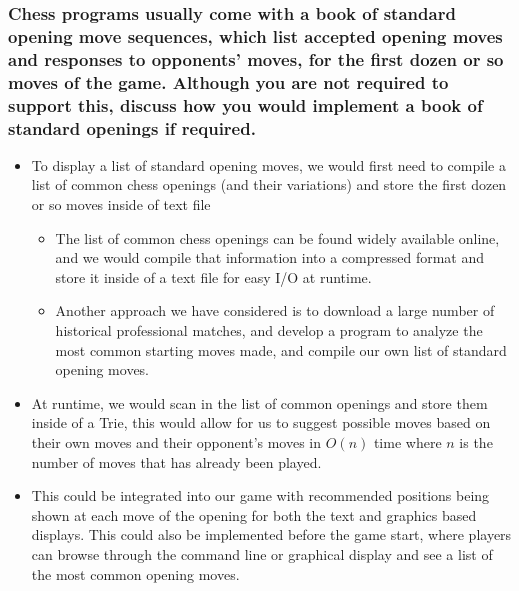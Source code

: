 \documentclass{article}
\begin{document}
\subsubsection*{Chess programs usually come with a book of standard opening move sequences, which list accepted opening moves and responses to opponents’ moves, for the first dozen or so moves of the game. Although you are not required to support this, discuss how you would implement a book of standard openings if required.}
\begin{itemize}
    \item To display a list of standard opening moves, we would first need to compile a list of common chess openings (and their variations) and store the first dozen or so moves inside of text file
    \begin{itemize}
        \item The list of common chess openings can be found widely available online, and we would compile that information into a compressed format and store it inside of a text file for easy I/O at runtime.
        \item Another approach we have considered is to download a large number of historical professional matches, and develop a program to analyze the most common starting moves made, and compile our own list of standard opening moves.
    \end{itemize}
    \item At runtime, we would scan in the list of common openings and store them inside of a Trie, this would allow for us to suggest possible moves based on their own moves and their opponent's moves in $O(n)$ time where $n$ is the number of moves that has already been played.
    \item This could be integrated into our game with recommended positions being shown at each move of the opening for both the text and graphics based displays. This could also be implemented 
    before the game start, where players can browse through the command line or graphical display and see a list of the most common opening moves.
\end{itemize}
\end{document}
